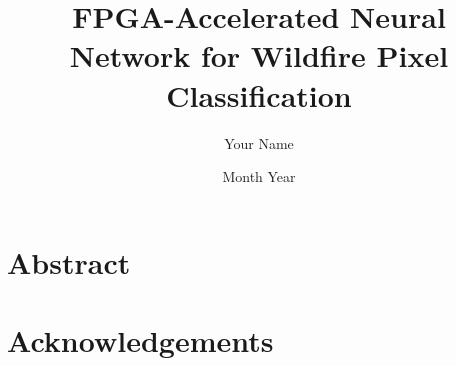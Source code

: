 \documentclass[12pt,oneside]{book}
\title{FPGA-Accelerated Neural Network for Wildfire Pixel Classification}
\author{Your Name}
\date{Month Year}
\begin{document}

\frontmatter

\chapter*{Abstract}


\chapter*{Acknowledgements}


\tableofcontents
\listoffigures
\listoftables

\mainmatter








\appendix


\printbibliography
\end{document}
